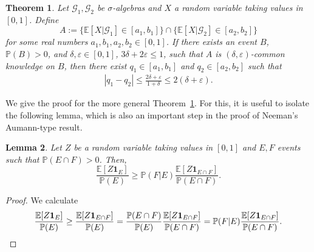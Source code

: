 \documentclass[a4paper, 10pt]{article}
\newtheorem{theorem}{Theorem}
\numberwithin{theorem}{section}
\newtheorem{lemma}[theorem]{Lemma}
\theoremstyle{definition}
\newcommand{\E}{\mathbb{E}}
\newcommand{\G}{\mathcal{G}}
\newcommand{\ind}[1]{\mathbf{1}_{#1}}
\renewcommand{\epsilon}{\varepsilon}
\renewcommand{\P}{\mathbb{P}}
\begin{document}
\begin{theorem}\label{theo:aumann_for_delta_eps_ck}
	Let $\G_1,\G_2$ be $\sigma$-algebras  and $X$  a random variable taking values in $[0,1]$.
	Define 
	$$A:=\{\E[X|\G_1]\in [a_1,b_1] \} \cap  \{\E[X|\G_2]\in [a_2,b_2] \}$$
	for some real numbers $ a_1,b_1,a_2,b_2 \in [0,1]$.
	If there exists an event $B$, $\P(B)>0$, and $\delta, \epsilon \in [0,1]$, $3\delta + 2\epsilon \leq 1$,  such that $A$ is $(\delta,\epsilon)$-common knowledge on $B$, then there exist $q_1 \in [a_1,b_1]$ and $q_2 \in [a_2,b_2]$  such that 
	\begin{align}\label{align:Set_Aumann_1}
		|q_1-q_2| \leq \frac{2\delta+ \epsilon}{1+\delta} \leq 2 (\delta+\epsilon).
	\end{align}	
\end{theorem}





We give the proof for the more general Theorem~\ref{theo:aumann_for_delta_eps_ck}. For this, it is useful to isolate the following lemma, which is also an important step in the proof of Neeman's~\cite{Ne96} Aumann-type result.


\begin{lemma}\label{lemma:ungl_fuer_aumann}
	Let $Z$ be a random variable taking values in $[0,1]$ and $E,F$ events such that $\P(E\cap F) > 0$. Then,
	\begin{equation*}
		\frac{\E[Z \ind{E}]}{\P(E)} \geq \P(F|E) \frac{\E[Z \ind{E\cap F}]}{\P(E\cap F)}.
	\end{equation*}
\end{lemma}

\begin{proof}
	We calculate
	\begin{equation*}
		\frac{\E[Z \ind{E}]}{\P(E)} \geq \frac{\E[Z \ind{E\cap F}]}{\P(E)} = \frac{\P(E\cap F)}{\P(E)} \frac{\E[Z \ind{E\cap F}]}{\P(E\cap F)}=\P(F|E) \frac{\E[Z \ind{E \cap F}]}{\P(E\cap F)}. \qedhere
	\end{equation*}
\end{proof}
\end{document}
